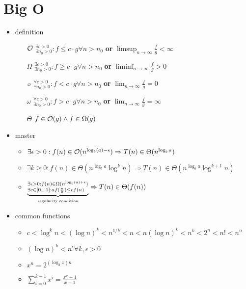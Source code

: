 \documentclass{article}
\begin{document}
\section{Big O}
\begin{itemize}
  \item definition
        \begin{itemize}
          \item[$\mathcal{O}$] $^{\exists c > 0}_{\exists n_0 > 0}: f \leq c \cdot g \forall n > n_0$ \textbf{or} $\limsup_{n\to\infty} \frac{f}{g} < \infty$
          \item[$\Omega$] $^{\exists c > 0}_{\exists n_0 > 0}: f \geq c \cdot g \forall n > n_0$ \textbf{or} $\liminf_{n\to\infty} \frac{f}{g} > 0$
          \item[${\scriptscriptstyle\mathcal{O}}$] $^{\forall c > 0}_{\exists n_0 > 0}: f < c \cdot g \forall n > n_0$ \textbf{or} $\lim_{n\to\infty} \frac{f}{g} = 0$
          \item[$\omega$] $^{\forall c > 0}_{\exists n_0 > 0}: f > c \cdot g \forall n > n_0$ \textbf{or} $\lim_{n\to\infty} \frac{f}{g} = \infty$
          \item[$\Theta$] $f\in \mathcal{O}(g) \land f\in \Omega(g)$
        \end{itemize}
  \item master
        \begin{itemize}
          \item $\exists \epsilon > 0: f(n) \in \mathcal{O}(n^{\log_b(a)-\epsilon}) \Rightarrow T(n) \in \Theta(n^{\log_b a})$
          \item $\exists k \ge 0: f(n) \in \Theta(n^{\log_b a}\log^k n) \Rightarrow T(n) \in \Theta(n^{\log_b a} \log^{k+1} n)$
          \item $\underbrace{^{\exists \epsilon > 0: f(n) \in \Omega(n^{\log_b(a)+\epsilon})}_{\exists c \in [0\dots1]: a f(\frac{n}{b}) \leq c f(n)}}_{\text{\tiny regularity condition}} \Rightarrow T(n) \in \Theta(f(n))$
        \end{itemize}
  \item common functions \begin{itemize}
          \item $c<\log^k n<(\log n)^k<n^{1/k}<n<n(\log n)^k<n^k<2^n<n!<n^n$
          \item $(\log n)^k < n^\epsilon \forall k,\epsilon > 0$
          \item $x^n=2^{(\log_2 x)n}$
          \item $\sum_{i=0}^{k-1} x^i = \frac{x^k-1}{x-1}$
        \end{itemize}
\end{itemize}
\end{document}

